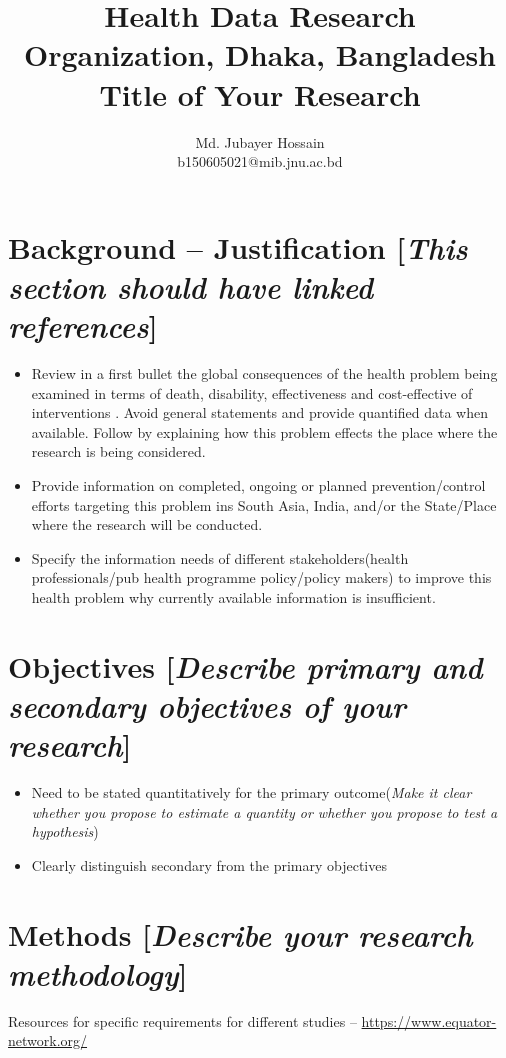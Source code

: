 \documentclass[10pt, a4paper]{article}
\title{\vspace{-15mm} Health Data Research Organization, Dhaka, Bangladesh \\ Title of Your Research}
\author{Md. Jubayer Hossain\\ b150605021@mib.jnu.ac.bd}
\date{}
\begin{document}
\maketitle

\section*{Background -- Justification [\textit{This section should have linked references}]}
\begin{itemize}
	\item Review in a first bullet the global consequences of the health problem being examined in terms of death, disability, effectiveness and cost-effective of interventions \cite{hossain2020lack}. Avoid general statements and provide quantified data when available. Follow by explaining how this problem effects the place where the research is being considered.
	\item Provide information on completed, ongoing or planned prevention/control efforts targeting this problem ins South Asia, India, and/or the State/Place where the research will be conducted.
	\item Specify the information needs of different stakeholders(health professionals/pub health programme policy/policy makers) to improve this health problem why currently available information is insufficient.
\end{itemize}



\section*{Objectives [\textit{Describe primary and secondary objectives of your research}]}
\begin{itemize}
	\item Need to be stated quantitatively for the primary outcome(\textit{Make it clear whether you propose to estimate a quantity or whether you propose to test a hypothesis})
	\item Clearly distinguish secondary from the primary objectives 
\end{itemize}

\section*{Methods [\textit{Describe your research methodology}]} 
Resources for specific requirements for different studies -- \url{https://www.equator-network.org/}
\end{document}
